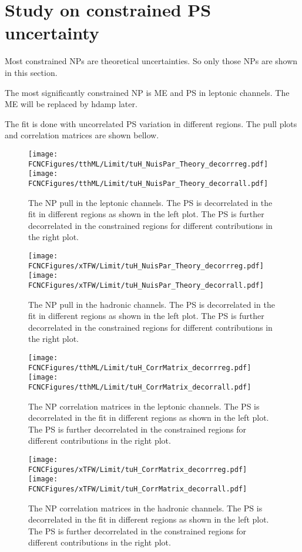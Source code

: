 \section{Study on constrained PS uncertainty}
\label{sec:decor}
Most constrained NPs are theoretical uncertainties. So only those NPs are shown in this section.

The most significantly constrained NP is ME and PS in leptonic channels. The ME will be replaced by hdamp later.

The fit is done with uncorrelated PS variation in different regions. The pull plots and correlation matrices are shown bellow.

\begin{figure}[H]
\centering
\texttt{[image: \\FCNCFigures/tthML/Limit/tuH\_NuisPar\_Theory\_decorrreg.pdf]}
\texttt{[image: \\FCNCFigures/tthML/Limit/tuH\_NuisPar\_Theory\_decorrall.pdf]}
\caption{ The NP pull in the leptonic channels. The PS is decorrelated in the fit in different regions as shown in the left plot. The PS is further decorrelated in the constrained regions for different contributions in the right plot. }
\label{fig:tuH_NuisPar_decorr}
\end{figure}

\begin{figure}[H]
\centering
\texttt{[image: \\FCNCFigures/xTFW/Limit/tuH\_NuisPar\_Theory\_decorrreg.pdf]}
\texttt{[image: \\FCNCFigures/xTFW/Limit/tuH\_NuisPar\_Theory\_decorrall.pdf]}
\caption{ The NP pull in the hadronic channels. The PS is decorrelated in the fit in different regions as shown in the left plot. The PS is further decorrelated in the constrained regions for different contributions in the right plot. }
\label{fig:tuH_NuisPar_decorr_had}
\end{figure}


\begin{figure}[H]
\centering
\texttt{[image: \\FCNCFigures/tthML/Limit/tuH\_CorrMatrix\_decorrreg.pdf]}
\texttt{[image: \\FCNCFigures/tthML/Limit/tuH\_CorrMatrix\_decorrall.pdf]}
\caption{ The NP correlation matrices in the leptonic channels. The PS is decorrelated in the fit in different regions as shown in the left plot. The PS is further decorrelated in the constrained regions for different contributions in the right plot. }
\label{fig:tuH_CorrMatrix_decorr}
\end{figure}

\begin{figure}[H]
\centering
\texttt{[image: \\FCNCFigures/xTFW/Limit/tuH\_CorrMatrix\_decorrreg.pdf]}
\texttt{[image: \\FCNCFigures/xTFW/Limit/tuH\_CorrMatrix\_decorrall.pdf]}
\caption{ The NP correlation matrices in the hadronic channels. The PS is decorrelated in the fit in different regions as shown in the left plot. The PS is further decorrelated in the constrained regions for different contributions in the right plot. }
\label{fig:tuH_CorrMatrix_decorr_had}
\end{figure}
